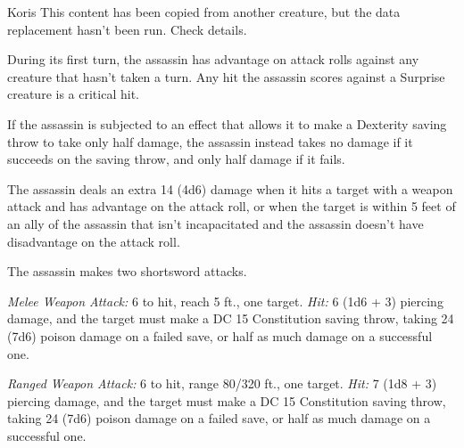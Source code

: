 \documentclass[10pt,a4paper,twoside,bg=print,twocolumn,openany,nodeprecatedcode]{dndbook}
\begin{document}
\begin{DndMonster}[float=t]{Koris}
\DndMonsterBasics[
armor-class = {15 (studded leather armor)},
hit-points = {\DndDice{12d8 + 24}},
speed = {30 ft.}
]
\DndMonsterAbilityScores[
 str = 11,
 dex = 16,
 con = 14,
 int = 13,
 wis = 11,
 cha = 10
]
\DndMonsterDetails[
saving-throws = {Dex +6, Int +4},
skills = {Acrobatics +6, Deception +3, Perception +3, Stealth +9},
damage-resistances = {poison},
languages = {Thieves' cant plus any two languages},
challenge = 8,
]
This content has been copied from another creature, but the data replacement hasn't been run. Check details.

During its first turn, the assassin has advantage on attack rolls against any creature that hasn't taken a turn. Any hit the assassin scores against a Surprise creature is a critical hit.

If the assassin is subjected to an effect that allows it to make a Dexterity saving throw to take only half damage, the assassin instead takes no damage if it succeeds on the saving throw, and only half damage if it fails.

The assassin deals an extra 14 (4d6) damage when it hits a target with a weapon attack and has advantage on the attack roll, or when the target is within 5 feet of an ally of the assassin that isn't incapacitated and the assassin doesn't have disadvantage on the attack roll.

The assassin makes two shortsword attacks.

\textsl{Melee Weapon Attack:} 6 to hit, reach 5 ft., one target. \textsl{Hit:} 6 (1d6 + 3) piercing damage, and the target must make a DC 15 Constitution saving throw, taking 24 (7d6) poison damage on a failed save, or half as much damage on a successful one.

\textsl{Ranged Weapon Attack:} 6 to hit, range 80/320 ft., one target. \textsl{Hit:} 7 (1d8 + 3) piercing damage, and the target must make a DC 15 Constitution saving throw, taking 24 (7d6) poison damage on a failed save, or half as much damage on a successful one.

\end{DndMonster}
\end{document}
